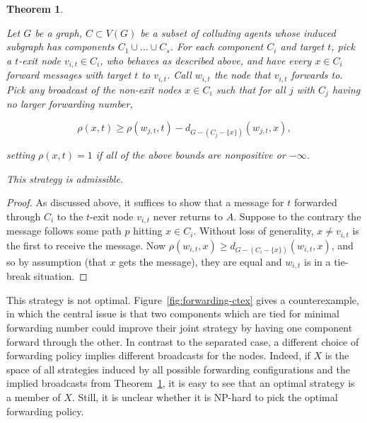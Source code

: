 \documentclass[reprint]{revtex4-1}
\newtheorem{theorem}{Theorem}[section]
\begin{document}
\begin{theorem}\label{thm:generalization}

Let $G$ be a graph, $C \subset V(G)$ be a subset of colluding agents whose
induced subgraph has components $C_1 \cup \dots \cup C_s$. For each component
$C_i$ and target $t$, pick a $t$-exit node $v_{i,t} \in C_i$, who behaves as
described above, and have every $x \in C_i$ forward messages with target $t$ to
$v_{i,t}$. Call $w_{i,t}$ the node that $v_{i,t}$ forwards to. Pick any
broadcast of the non-exit nodes $x \in C_i$ such that for all $j$ with $C_j$
having no larger forwarding number,

\[ 
    \rho(x,t) \geq \rho(w_{j,t},t) - d_{G-(C_j - \{ x \} )}(w_{j,t}, x),
\]

setting $\rho(x,t) = 1$ if all of the above bounds are nonpositive or
$-\infty$. 

This strategy is admissible.

\end{theorem}

\begin{proof}

As discussed above, it suffices to show that a message for $t$ forwarded
through $C_i$ to the $t$-exit node $v_{i,t}$ never returns to $A$. Suppose to
the contrary the message follows some path $p$ hitting $x \in C_i$. Without
loss of generality, $x \neq v_{i,t}$ is the first to receive the message. Now
$\rho(w_{i,t}, x) \geq d_{G-(C_i - \{ x \})}(w_{i,t}, x)$, and so by assumption
(that $x$ gets the message), they are equal and $w_{i,t}$ is in a tie-break
situation.
\end{proof}

This strategy is not optimal. Figure~\ref{fig:forwarding-ctex} gives a
counterexample, in which the central issue is that two components which are
tied for minimal forwarding number could improve their joint strategy by having
one component forward through the other. In contrast to the separated case, a
different choice of forwarding policy implies different broadcasts for the
nodes. Indeed, if $X$ is the space of all strategies induced by all possible
forwarding configurations and the implied broadcasts from
Theorem~\ref{thm:generalization}, it is easy to see that an optimal strategy is
a member of $X$.  Still, it is unclear whether it is NP-hard to pick the
optimal forwarding policy.
\end{document}
